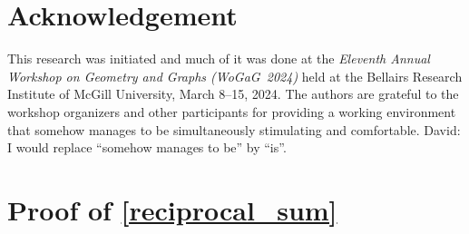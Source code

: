 \documentclass{patmorin}
\newcommand{\david}[1]{{\color{orange} David: #1}}
\begin{document}
\section*{Acknowledgement}

This research was initiated and much of it was done at the \emph{Eleventh Annual Workshop on Geometry and Graphs (WoGaG~2024)} held at the Bellairs Research Institute of McGill University, March 8--15, 2024. The authors are grateful to the workshop organizers and other participants for providing a working environment that somehow manages to be simultaneously stimulating and comfortable.
\david{I would replace ``somehow manages to be'' by ``is''.}





\appendix

\section{Proof of \cref{reciprocal_sum}}
\label{reciprocal_sum_section}


\reciprocalsum*
\end{document}
